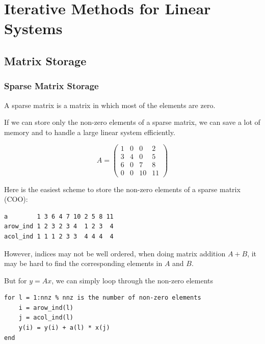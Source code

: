 \chapter{Iterative Methods for Linear Systems}

\section{Matrix Storage}


\subsection{Sparse Matrix Storage}

\begin{definition}
    A sparse matrix is a matrix in which most of the elements are zero.
\end{definition}

If we can store only the non-zero elements of a sparse matrix, we can save a lot of memory and to handle a large linear system efficiently.

\begin{eg}
    \begin{equation*}
    A = 
    \begin{pmatrix}
      1 & 0 & 0 & 2 \\
      3 & 4 & 0 & 5 \\
      6 & 0 & 7 & 8 \\
      0 & 0 &10 &11
    \end{pmatrix}
  \end{equation*}
\end{eg}

Here is the easiest scheme to store the non-zero elements of a sparse matrix  (COO):

\begin{verbatim}
a        1 3 6 4 7 10 2 5 8 11
arow_ind 1 2 3 2 3 4  1 2 3  4
acol_ind 1 1 1 2 3 3  4 4 4  4
\end{verbatim}

However, indices may not be well ordered, when doing matrix addition $A+B$, it may be hard to find the corresponding elements in $A$ and $B$.

But for $y = Ax$, we can simply loop through the non-zero elements 
\begin{verbatim}
for l = 1:nnz % nnz is the number of non-zero elements
    i = arow_ind(l)
    j = acol_ind(l)
    y(i) = y(i) + a(l) * x(j)
end
\end{verbatim}

